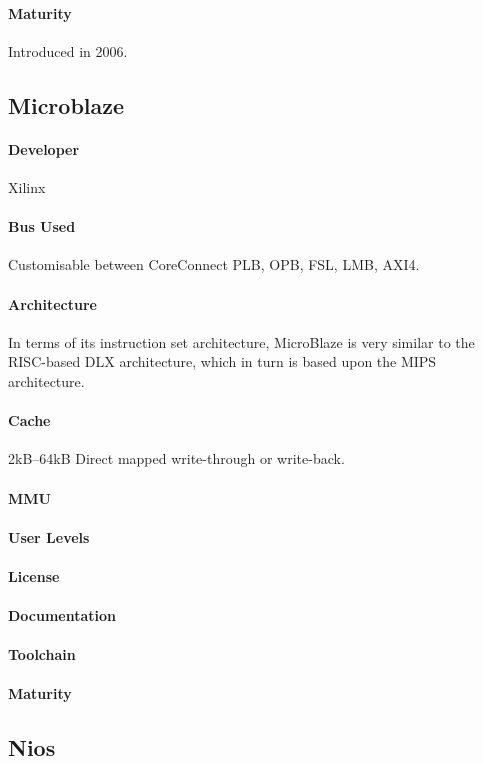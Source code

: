 \documentclass[11pt]{article} %
\begin{document}
\paragraph{Maturity} Introduced in 2006.

\subsection{Microblaze}
\paragraph{Developer} Xilinx
\paragraph{Bus Used} Customisable between CoreConnect PLB, OPB, FSL, LMB, AXI4.
\paragraph{Architecture} In terms of its instruction set architecture, MicroBlaze is very similar to the RISC-based DLX architecture, which in turn is based upon the MIPS architecture.
\paragraph{Cache} 2kB--64kB Direct mapped write-through or write-back.
\paragraph{MMU} 
\paragraph{User Levels} 
\paragraph{License} 
\paragraph{Documentation} 
\paragraph{Toolchain} 
\paragraph{Maturity} 

\subsection{Nios}
\end{document}
